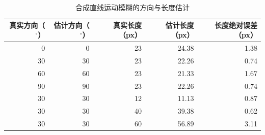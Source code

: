 \begin{table}[htbp]
\centering
\caption{合成直线运动模糊的方向与长度估计}
\label{tab:radon-synthetic}
\begin{tabular}{rrrrr}
\toprule
真实方向（$^\circ$） & 估计方向（$^\circ$） & 真实长度（px） & 估计长度（px） & 长度绝对误差（px） \\
\midrule
0 & 0 & 23 & 24.38 & 1.38 \\
30 & 30 & 23 & 22.26 & 0.74 \\
60 & 60 & 23 & 21.33 & 1.67 \\
90 & 90 & 23 & 22.26 & 0.74 \\
30 & 30 & 12 & 11.13 & 0.87 \\
30 & 30 & 40 & 39.38 & 0.62 \\
30 & 30 & 60 & 56.89 & 3.11 \\
\bottomrule
\end{tabular}
\end{table}

